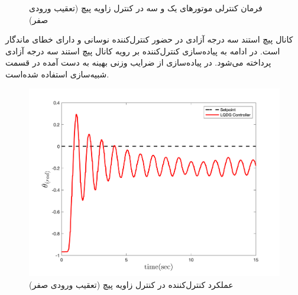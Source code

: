 \documentclass{CCI2020}
\begin{document}
	\begin{figure}[H]
		\centering
		\caption{فرمان کنترلی موتورهای یک و سه در کنترل زاویه پیچ (تعقیب ورودی صفر)}
	\end{figure}
	
	کانال پیچ استند سه درجه آزادی در حضور کنترل‌کننده  نوسانی و دارای خطای ماندگار است.
	در ادامه به پیاده‌سازی کنترل‌کننده  بر رویه کانال پیچ استند سه درجه آزادی پرداخته می‌شود.
	در پیاده‌سازی از ضرایب وزنی بهینه به دست آمده در قسمت شبیه‌سازی استفاده شده‌است.
	\begin{figure}[H]
		\includegraphics[width=.48\linewidth]{../Figures/Calibration/LQDG/Pitch/lqdg_pitch.png}
		\centering
		\caption{عملكرد کنترل‌کننده  در کنترل زاويه پیچ (تعقیب ورودی صفر)}
	\end{figure}
	
\end{document}
